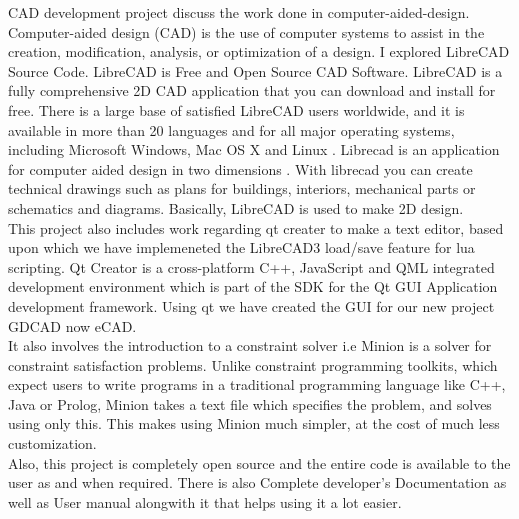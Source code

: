 \begin{Large}
\end{Large}

\noindent CAD development project discuss the work done in computer-aided-design. Computer-aided design (CAD) is the use of computer systems to assist in the creation, modification, analysis, or optimization of a design. I explored  LibreCAD  Source  Code. LibreCAD is Free and Open Source CAD Software. LibreCAD is a  fully  comprehensive  2D  CAD   application  that  you  can  download  and  install  for  free.  There  is  a  large base  of  satisfied  LibreCAD   users  worldwide,  and  it  is  available  in  more  than  20  languages  and  for  all
major  operating  systems,  including  Microsoft  Windows,  Mac  OS  X  and  Linux .  Librecad  is  an  application  for  computer  aided  design  in  two dimensions  .  With  librecad   you   can  create  technical  drawings  such  as  plans  for  buildings,  interiors,
mechanical parts or schematics and diagrams. Basically, LibreCAD is used to make 2D design. \\

\noindent This project also includes work regarding qt creater to make a text editor, based upon which we have implemeneted the LibreCAD3 load/save feature for lua scripting. Qt Creator is a cross-platform C++, JavaScript and QML integrated development environment which is part of the SDK for the Qt GUI Application development framework. Using qt we have created the GUI for our new project GDCAD now eCAD.\\

\noindent It also involves the introduction to a constraint solver i.e Minion is a solver for constraint satisfaction problems. Unlike constraint programming toolkits, which expect users to write programs in a traditional programming language like C++, Java or Prolog, Minion takes a text file which specifies the problem, and solves using only this. This makes using Minion much simpler, at the cost of much less customization.\\

\noindent Also, this project is completely open source and the entire code is available 
to the user as and when required. There is also Complete developer's 
Documentation as well as User manual alongwith it that helps using it a lot easier.
